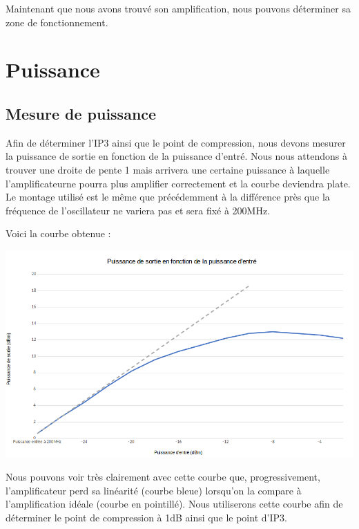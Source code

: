 \documentclass[a4paper,12pt]{report}            %
\begin{document}
Maintenant que nous avons trouvé son amplification, nous pouvons déterminer sa zone de fonctionnement.

\chapter{Puissance}

\section{Mesure de puissance}

Afin de déterminer l'IP3 ainsi que le point de compression, nous devons mesurer la puissance de
sortie en fonction de la puissance d'entré. Nous nous attendons à trouver une droite de pente 1
mais arrivera une certaine puissance à laquelle l'amplificateurne pourra plus amplifier correctement 
et la courbe deviendra plate. Le montage utilisé est le même que précédemment à la différence près
que la fréquence de l'oscillateur ne variera pas et sera fixé à 200MHz.

Voici la courbe obtenue :

\begin{center}\includegraphics[scale = 0.4]{pic/puissance_graph.png}\\ \end{center}
    
Nous pouvons voir très clairement avec cette courbe que, progressivement, l'amplificateur perd sa linéarité
(courbe bleue) lorsqu'on la compare à l'amplification idéale (courbe en pointillé).
Nous utiliserons cette courbe afin de déterminer le point de compression à 1dB ainsi que le point d'IP3.

\newpage
\end{document}

